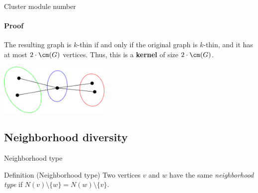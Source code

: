 \documentclass{beamer}
\begin{document}
\begin{frame}{Cluster module number}
    \framesubtitle{Proof}
    The resulting graph is $k$-thin if and only if the original graph is $k$-thin, and it has at most $2 \cdot \cm(G)$ vertices. Thus, this is a \textbf{kernel} of size $2 \cdot \cm(G)$.
    \begin{center}
        \includegraphics[width=0.4\textwidth]{img/cluster_module_partition_lemma_2.png}
    \end{center}
\end{frame}


\subsection{Neighborhood diversity}
\begin{frame}{Neighborhood type}
    \begin{block}{Definition (Neighborhood type)}
        Two vertices $v$ and $w$ have the same \emph{neighborhood type} if $N(v) \setminus \{w\} = N(w) \setminus \{v\}$.
    \end{block}

    \begin{figure}
        \centering
    \end{figure}
\end{frame}
\end{document}
